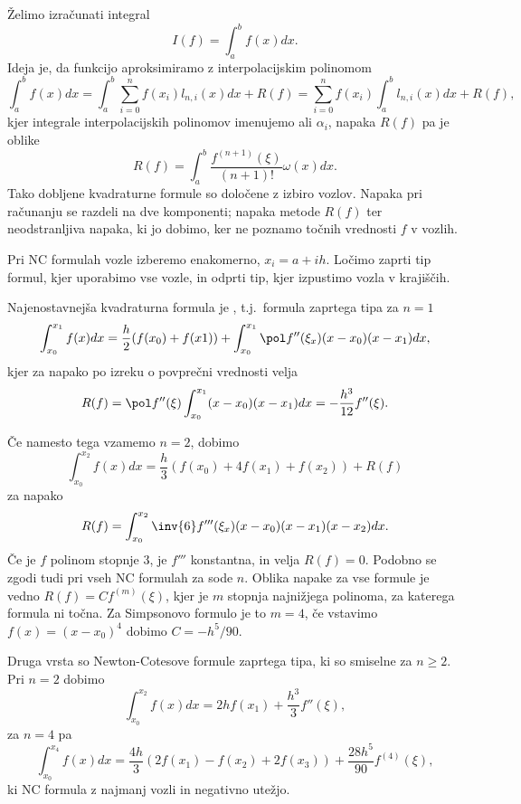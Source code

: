 
Želimo izračunati integral
\[
  I(f) = \int_a^b f(x) dx.
\]
Ideja je, da funkcijo aproksimiramo z interpolacijskim polinomom
\[
  \int_a^b f(x) dx
  = \int_a^b \sum_{i=0}^n f(x_i) l_{n,i}(x) dx + R(f)
  = \sum_{i=0}^n f(x_i) \int_a^b l_{n,i}(x) dx + R(f),
\]
kjer integrale interpolacijskih polinomov imenujemo  ali
 $\alpha_i$, napaka $R(f)$ pa je oblike
\[
  R(f) = \int_a^b \frac{f^{(n+1)}(\xi)}{(n+1)!} \omega(x) dx.
\]
Tako dobljene kvadraturne formule so določene z izbiro vozlov.
Napaka pri računanju se razdeli na dve komponenti; napaka metode $R(f)$ ter
neodstranljiva napaka, ki jo dobimo, ker ne poznamo točnih vrednosti $f$ v
vozlih.



Pri NC formulah vozle izberemo enakomerno, $x_i = a + ih$.
Ločimo zaprti tip formul, kjer uporabimo vse vozle, in odprti tip, kjer
izpustimo vozla v krajiščih.

Najenostavnejša kvadraturna formula je , t.j.~formula
zaprtega tipa za $n=1$
\[
  \int_{x_0}^{x_1} f(x) dx = \frac{h}{2} (f(x_0) + f(x1))
  + \int_{x_0}^{x_1} \pol f''(\xi_x) (x-x_0) (x-x_1) dx,
\]
kjer za napako po izreku o povprečni vrednosti velja
\[
  R(f) = \pol f''(\xi) \int_{x_0}^{x_1} (x-x_0)(x - x_1) dx = - \frac{h^3}{12}
  f''(\xi).
\]


Če namesto tega vzamemo $n=2$, dobimo 
\[
  \int_{x_0}^{x_2} f(x) dx
  = \frac{h}{3} (f(x_0) + 4 f(x_1) + f(x_2)) + R(f)
\]
za napako
\[
  R(f) = \int_{x_0}^{x_2} \inv{6} f'''(\xi_x) (x-x_0) (x-x_1) (x-x_2) dx.
\]
Če je $f$ polinom stopnje $3$, je $f'''$ konstantna, in velja $R(f) = 0$.
Podobno se zgodi tudi pri vseh NC formulah za sode $n$.
Oblika napake za vse formule je vedno $R(f) = C f^{(m)}(\xi)$, kjer je $m$
stopnja najnižjega polinoma, za katerega formula ni točna.
Za Simpsonovo formulo je to $m = 4$, če vstavimo $f(x) = (x-x_0)^4$ dobimo $C =
-h^5 / 90$.


Druga vrsta so Newton-Cotesove formule zaprtega tipa, ki so smiselne za $n \ge
2$.
Pri $n = 2$ dobimo 
\[
  \int_{x_0}^{x_2} f(x) dx = 2 h f(x_1) + \frac{h^3}{3} f''(\xi),
\]
za $n = 4$ pa 
\[
  \int_{x_0}^{x_4} f(x) dx
  = \frac{4h}{3} (2 f(x_1) - f(x_2) + 2 f(x_3)) + \frac{28 h^5}{90} f^{(4)}(\xi),
\]
ki NC formula z najmanj vozli in negativno utežjo.

